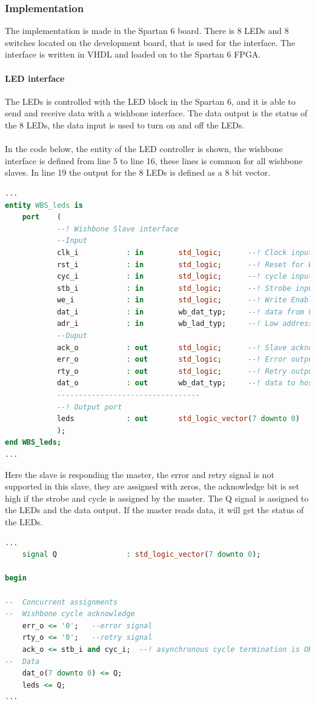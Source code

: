 \subsubsection{Implementation}
The implementation is made in the Spartan 6 board. There is 8 LEDs and 8 switches located on the development board, that is used for the interface. The interface is written in VHDL and loaded on to the Spartan 6 FPGA.
\paragraph{LED interface}
The LEDs is controlled with the LED block in the Spartan 6, and it is able to send and receive data with a wishbone interface. The data output is the status of the 8 LEDs, the data input is used to turn on and off the LEDs.\\\\
In the code below, the entity of the LED controller is shown, the wishbone interface is defined from line 5 to line 16, these lines is common for all wishbone slaves. In line 19 the output for the 8 LEDs is defined as a 8 bit vector.
\begin{lstlisting}[language=VHDL]
...
entity WBS_leds is
	port	(
			--! Wishbone Slave interface
			--Input
			clk_i			: in		std_logic;		--! Clock input from SYSCON
			rst_i			: in		std_logic;		--! Reset for Wishbone interface
			cyc_i			: in		std_logic;		--! cycle input, asserted when cycle is in progress
			stb_i			: in		std_logic;		--! Strobe input, similar to Chip Select
			we_i			: in		std_logic;		--! Write Enable: High=WR, Low=RD
			dat_i			: in		wb_dat_typ;		--! data from host
			adr_i			: in		wb_lad_typ;		--! Low address input
			--Ouput
			ack_o			: out		std_logic;		--! Slave acknowledge output, asserted after sucessful cycle
			err_o			: out		std_logic;		--! Error output, abnormal cycle termination
			rty_o			: out		std_logic;		--! Retry output, slave not ready
			dat_o			: out		wb_dat_typ;		--! data to host
			---------------------------------
			--! Output port
			leds			: out		std_logic_vector(7 downto 0)
			);
end WBS_leds;
...
\end{lstlisting}
Here the slave is responding the master, the error and retry signal is not supported in this slave, they are assigned with zeros, the acknowledge bit is set high if the strobe and cycle is assigned by the master. The Q signal is assigned to the LEDs and the data output. If the master reads data, it will get the status of the LEDs.
\begin{lstlisting}[language=VHDL]
...
	signal Q				: std_logic_vector(7 downto 0);

begin

--  Concurrent assignments
--	Wishbone cycle acknowledge
	err_o <= '0';	--error signal
	rty_o <= '0';	--retry signal
	ack_o <= stb_i and cyc_i;  --! asynchronous cycle termination is OK here.
--	Data
	dat_o(7 downto 0) <= Q;
	leds <= Q;
...
\end{lstlisting}
